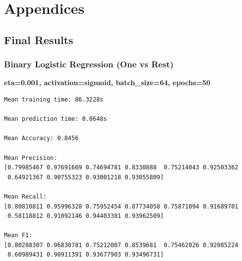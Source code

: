 \documentclass[11pt,a4paper]{article}
\begin{document}
\pagebreak



 
 

\pagebreak

\section*{Appendices}

\subsection*{Final Results}
\subsubsection*{Binary Logistic Regression (One vs Rest)}
\textbf{eta=0.001, activation=sigmoid, batch\_size=64, epochs=50}

\begin{verbatim}
Mean training time: 86.3228s

Mean prediction time: 0.0648s

Mean Accuracy: 0.8456

Mean Precision:
[0.79985467 0.97691669 0.74694781 0.8330888  0.75214043 0.92503362
 0.64921367 0.90755323 0.93001218 0.93055809]

Mean Recall:
[0.80810811 0.95996328 0.75952454 0.87734058 0.75871094 0.91689701
 0.58118812 0.91092146 0.94403381 0.93962509]

Mean F1:
[0.80288307 0.96830781 0.75212007 0.8539681  0.75462026 0.92085224
 0.60989431 0.90911391 0.93677903 0.93496731]
\end{verbatim}
\end{document}
